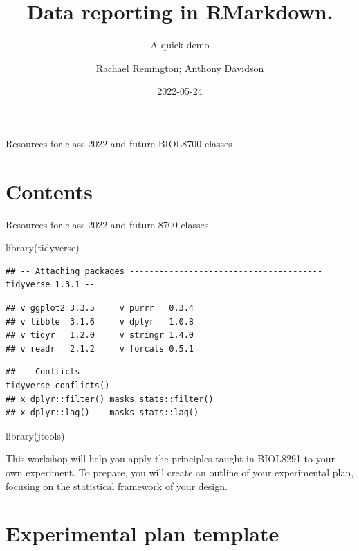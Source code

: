 \documentclass[
]{book}
\title{Data reporting in RMarkdown.}
\subtitle{A quick demo}
\author{Rachael Remington; Anthony Davidson}
\date{2022-05-24}
\newenvironment{Shaded}{\begin{snugshade}}{\end{snugshade}}
\newcommand{\FunctionTok}[1]{\textcolor[rgb]{0.00,0.00,0.00}{#1}}
\newcommand{\NormalTok}[1]{#1}
\begin{document}
\maketitle

{
\setcounter{tocdepth}{1}
\tableofcontents
}
Resources for class 2022 and future BIOL8700 classes

\hypertarget{contents}{%
\chapter{Contents}\label{contents}}

Resources for class 2022 and future 8700 classes

\begin{Shaded}
\begin{Highlighting}[]
\FunctionTok{library}\NormalTok{(tidyverse)}
\end{Highlighting}
\end{Shaded}

\begin{verbatim}
## -- Attaching packages --------------------------------------- tidyverse 1.3.1 --
\end{verbatim}

\begin{verbatim}
## v ggplot2 3.3.5     v purrr   0.3.4
## v tibble  3.1.6     v dplyr   1.0.8
## v tidyr   1.2.0     v stringr 1.4.0
## v readr   2.1.2     v forcats 0.5.1
\end{verbatim}

\begin{verbatim}
## -- Conflicts ------------------------------------------ tidyverse_conflicts() --
## x dplyr::filter() masks stats::filter()
## x dplyr::lag()    masks stats::lag()
\end{verbatim}

\begin{Shaded}
\begin{Highlighting}[]
\FunctionTok{library}\NormalTok{(jtools)}
\end{Highlighting}
\end{Shaded}

This workshop will help you apply the principles taught in BIOL8291 to your own experiment. To prepare, you will create an outline of your experimental plan, focusing on the statistical framework of your design.

\hypertarget{experimental-plan-template}{%
\chapter{Experimental plan template}\label{experimental-plan-template}}
\end{document}

